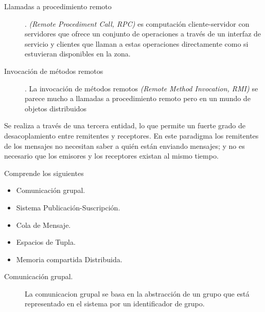 \begin{description}
\begin{description}
		\item[Llamadas a procedimiento remoto].  \textit{(Remote Procediment Call, RPC)} es computación cliente-servidor con servidores que ofrece un conjunto de operaciones a través de un interfaz de servicio y clientes que llaman a estas operaciones directamente como si estuvieran disponibles en la zona.  
		
		\item [Invocación de métodos remotos]. La invocación de métodos remotos \textit{(Remote Method Invocation, RMI)} se parece mucho a llamadas a procedimiento remoto pero en un mundo de objetos distribuidos  
	
	\end{description}
	
	\item[Comunicaci\'n Indirecta] Se realiza a  través de una tercera entidad, lo que permite un fuerte grado de desacoplamiento entre remitentes y receptores. En este paradigma los remitentes de los mensajes no necesitan saber a quién están enviando mensajes; y no es necesario que los emisores y los receptores existan al mismo tiempo. 
	 
	
		  
		
		
			\begin{tcolorbox}
			[colback=green!5!white,colframe=green!75!black,fonttitle=\bfseries,title=Comunicaci\'on indirecta ]
				Comprende los siguientes 
			\begin{itemize}
				\item Comunicación grupal.  				
				\item Sistema Publicación-Suscripción.
				\item Cola de Mensaje.
				\item Espacios de Tupla.
				\item Memoria compartida Distribuida.
			\end{itemize}
			\end{tcolorbox}
		
	
	
	\begin{description}		
		\item[ Comunicaci\'on grupal.]  La \gls{comunicacion grupal} se basa en la abstracción de un grupo que está representado en el sistema por un identificador de grupo.  
		

\end{description}
\end{description}
